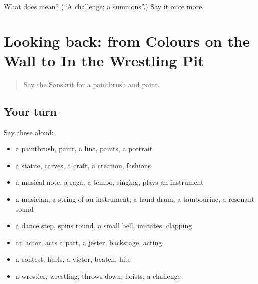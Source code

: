 \begin{tcolorbox}[breakable,colback=teal!4,colframe=teal!35!black,title={Before you move on}]
What does  mean? (\textquotedblleft{}A challenge; a summons\textquotedblright{}.) Say it once more.
\end{tcolorbox}
\section[(dialogue)]{Looking back: from Colours on the Wall to In the Wrestling Pit}

\label{lesson:SA-R525-review-518-525}



\begin{quote}
Say the Sanskrit for a paintbrush and paint.
\end{quote}

\subsection*{Your turn}
Say these aloud:

\begin{itemize}
\raggedright
  \item a paintbrush, paint, a line, paints, a portrait
  \item a statue, carves, a craft, a creation, fashions
  \item a musical note, a raga, a tempo, singing, plays an instrument
  \item a musician, a string of an instrument, a hand drum, a tambourine, a resonant sound
  \item a dance step, spins round, a small bell, imitates, clapping
  \item an actor, acts a part, a jester, backstage, acting
  \item a contest, hurls, a victor, beaten, hits
  \item a wrestler, wrestling, throws down, hoists, a challenge
\end{itemize}

